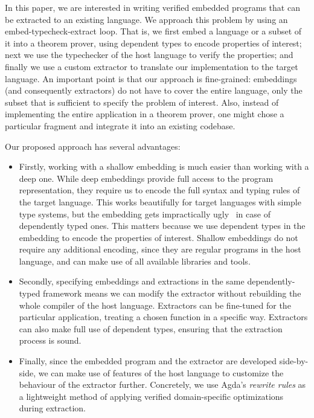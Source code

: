 \documentclass[acmsmall,review,anonymous]{acmart}\settopmatter{printfolios=true,printccs=false,printacmref=false}
\begin{document}
In this paper, we are interested in writing verified embedded programs
that can be extracted to an existing language.  We approach this problem by
using an embed-typecheck-extract loop.  That is, we first embed a
language or a subset of it into a theorem prover, using dependent
types to encode properties of interest; next we use the typechecker of
the host language to verify the properties; and finally we use a
custom extractor to translate our implementation to the target
language.
%
An important point is that our approach is fine-grained: embeddings
(and consequently extractors) do not have to cover the entire
language, only the subset that is sufficient to specify the problem of
interest.  Also, instead of implementing the entire application in a
theorem prover, one might chose a particular fragment and integrate it
into an existing codebase.

Our proposed approach has several advantages:
\begin{itemize}
  \item Firstly, working with a shallow embedding is much easier than
  working with a deep one.  While deep embeddings provide full access
  to the program representation, they require us to encode the full
  syntax and typing rules of the target language.
  This works beautifully for target languages with simple
  type systems, but the embedding gets impractically ugly~\cite{} in
  case of dependently typed ones.  This matters because we use
  dependent types in the embedding to encode the properties of
  interest.  Shallow embeddings do not require any additional
  encoding, since they are regular programs in the host language, and
  can make use of all available libraries and tools.

  \item Secondly, specifying embeddings and extractions in the same
  dependently-typed framework means we can modify the extractor
  without rebuilding the whole compiler of the host language.
  Extractors can be fine-tuned for the particular application, \eg{}
  treating a chosen function in a specific way.  Extractors can also make
  full use of dependent types, ensuring that the extraction process is
  sound.

  \item Finally, since the embedded program and the extractor are
  developed side-by-side, we can make use of features of the host
  language to customize the behaviour of the extractor
  further. Concretely, we use Agda's \emph{rewrite rules} as a
  lightweight method of applying verified domain-specific
  optimizations during extraction.
\end{itemize}
\end{document}

